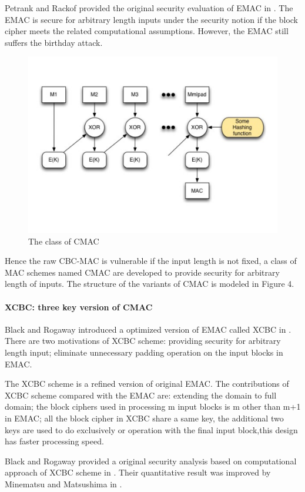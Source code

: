 \documentclass{article}
\begin{document}
Petrank and Rackof provided the original security evaluation of EMAC in \cite{emac}. The EMAC is secure for arbitrary length inputs under the security notion if the block cipher meets the related computational assumptions. However, the EMAC still suffers the birthday attack.

\begin{figure}[htbp]
\centering
\includegraphics[scale=0.3]{./diagrams/cmac.pdf}
\caption{The class of CMAC}
\label{CMAC }
\end{figure}
Hence the raw CBC-MAC is vulnerable if the input length is not fixed, a class of MAC schemes named CMAC are developed to provide security for arbitrary length of inputs. The structure of the  variants of CMAC is modeled in Figure 4.
\paragraph{XCBC: three key version of CMAC }
Black and Rogaway introduced a optimized version of EMAC called XCBC in \cite{xcbc}.
There are two motivations of XCBC scheme: providing security for arbitrary length input; eliminate unnecessary padding operation on the input blocks in EMAC.

The XCBC scheme is a refined version of original EMAC. The contributions of XCBC scheme compared with the EMAC are: extending the domain to full domain; the block ciphers used in processing m input blocks is m other than m+1 in EMAC; all the block cipher in XCBC share a same key, the additional two keys are used to do exclusively or operation with the final input block,this design has faster processing speed.   

Black and Rogaway provided a original security analysis based on computational approach of XCBC scheme in \cite{xcbc}. Their quantitative result was improved by Minematsu and Matsushima in \cite{new}. 
\end{document}
